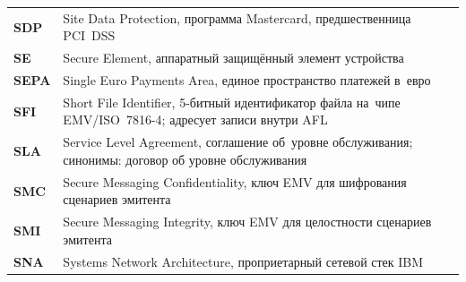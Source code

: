 \begin{longtable}{@{}p{4.5em}p{\dimexpr\linewidth-4.5em-2\tabcolsep\relax}@{}}
  \textbf{SDP}               & Site Data Protection, программа Mastercard, предшественница PCI~DSS                                                                                                                                                                                                                              \\
  \textbf{SE}                & Secure Element, аппаратный защищённый элемент устройства                                                                                                                                                                                                                                         \\
  \textbf{SEPA}              & Single Euro Payments Area, единое пространство платежей в~евро                                                                                                                                                                                                                                   \\
  \textbf{SFI}               & Short File Identifier, 5-битный идентификатор файла на~чипе EMV/ISO~7816-4; адресует записи внутри AFL                                                                                                                                                                                          \\
  \textbf{SLA}               & Service Level Agreement, соглашение об~уровне обслуживания; синонимы: договор об уровне обслуживания                                                                                                                                                                                             \\
  \textbf{SMC}               & Secure Messaging Confidentiality, ключ EMV для шифрования сценариев эмитента                                                                                                                                                                                                                     \\
  \textbf{SMI}               & Secure Messaging Integrity, ключ EMV для целостности сценариев эмитента                                                                                                                                                                                                                          \\
  \textbf{SNA}               & Systems Network Architecture, проприетарный сетевой стек IBM                                                                                                                                                                                                                                     \\

\end{longtable}
